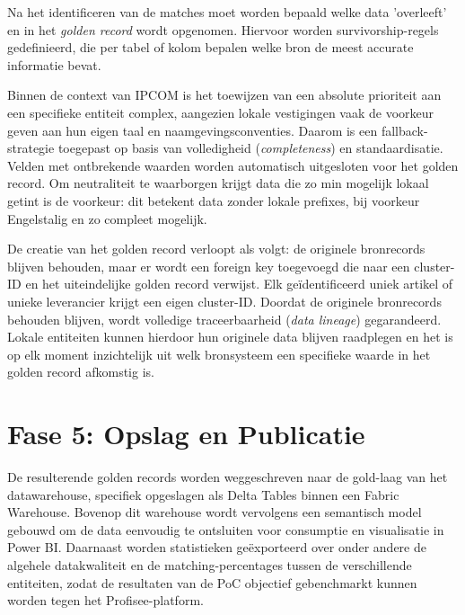 
Na het identificeren van de matches moet worden bepaald welke data 'overleeft' en in het \textit{golden record} wordt opgenomen. Hiervoor worden survivorship-regels gedefinieerd, die per tabel of kolom bepalen welke bron de meest accurate informatie bevat. 

Binnen de context van IPCOM is het toewijzen van een absolute prioriteit aan een specifieke entiteit complex, aangezien lokale vestigingen vaak de voorkeur geven aan hun eigen taal en naamgevingsconventies. Daarom is een fallback-strategie toegepast op basis van volledigheid (\textit{completeness}) en standaardisatie. Velden met ontbrekende waarden worden automatisch uitgesloten voor het golden record. Om neutraliteit te waarborgen krijgt data die zo min mogelijk lokaal getint is de voorkeur: dit betekent data zonder lokale prefixes, bij voorkeur Engelstalig en zo compleet mogelijk.

De creatie van het golden record verloopt als volgt: de originele bronrecords blijven behouden, maar er wordt een foreign key toegevoegd die naar een cluster-ID en het uiteindelijke golden record verwijst. Elk geïdentificeerd uniek artikel of unieke leverancier krijgt een eigen cluster-ID. Doordat de originele bronrecords behouden blijven, wordt volledige traceerbaarheid (\textit{data lineage}) gegarandeerd. Lokale entiteiten kunnen hierdoor hun originele data blijven raadplegen en het is op elk moment inzichtelijk uit welk bronsysteem een specifieke waarde in het golden record afkomstig is.

\section{Fase 5: Opslag en Publicatie}%
\label{sec:poc-publicatie}


De resulterende golden records worden weggeschreven naar de gold-laag van het datawarehouse, specifiek opgeslagen als Delta Tables binnen een Fabric Warehouse. Bovenop dit warehouse wordt vervolgens een semantisch model gebouwd om de data eenvoudig te ontsluiten voor consumptie en visualisatie in Power BI. Daarnaast worden statistieken geëxporteerd over onder andere de algehele datakwaliteit en de matching-percentages tussen de verschillende entiteiten, zodat de resultaten van de PoC objectief gebenchmarkt kunnen worden tegen het Profisee-platform.